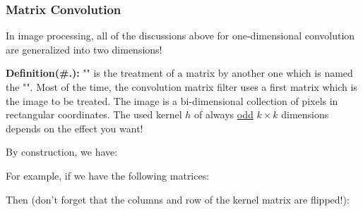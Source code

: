 	\subsubsection{Matrix Convolution}\label{matrix convolution}
	In image processing, all of the discussions above for one-dimensional convolution are generalized into two dimensions!
	
	\textbf{Definition(\#\thesection.\mydef):} "" is the treatment of a matrix by another one which is named the "". Most of the time, the convolution matrix filter uses a first matrix which is the image to be treated. The image is a bi-dimensional collection of pixels in rectangular coordinates. The used kernel $h$ of always \underline{odd} $k\times k$ dimensions  depends on the effect you want!
	
	By construction, we have:
	
	For example, if we have the following matrices:
	
	Then (don't forget that the columns and row of the kernel matrix are flipped!):
	
